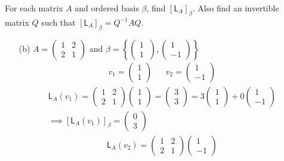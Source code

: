 For each matrix $A$ and ordered basis $\beta$, find
$[\mathsf{L}_A]_\beta$. Also find an invertible matrix $Q$ such that
$[\mathsf{L}_A]_\beta = Q^{-1}AQ$.
\begin{enumerate}[(a)]
\item[(b)] $A = \begin{pmatrix}1&2\\2&1
  \end{pmatrix}$ and $\beta =\left\{\begin{pmatrix}1\\1\
    \end{pmatrix},\begin{pmatrix}1\\-1
    \end{pmatrix}
  \right\}$
\begin{align}
v_1 =\begin{pmatrix} 1\\ 1 \end{pmatrix} & & v_2 =\begin{pmatrix} 1 \\
  -1 \end{pmatrix}
\end{align}
\begin{gather}
\mathsf{L}_{A}(v_1) = \begin{pmatrix} 1 & 2\\ 2 &
  1\end{pmatrix}\begin{pmatrix}1\\1\end{pmatrix}
= \begin{pmatrix}3\\3\end{pmatrix} = 3\begin{pmatrix}1\\1\end{pmatrix}
+ 0\begin{pmatrix}1\\-1\end{pmatrix}\\
\implies \left[\mathsf{L}_A(v_1)\right]_\beta = \begin{pmatrix}0\\3\end{pmatrix}
\end{gather}
\begin{gather}
\mathsf{L}_A(v_2) =\begin{pmatrix}1 & 2\\2
  &1\end{pmatrix}\begin{pmatrix}1\\-1\end{pmatrix}

\end{gather}
\end{enumerate}
